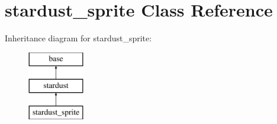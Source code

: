 \hypertarget{classstardust__sprite}{\section{stardust\-\_\-sprite Class Reference}
\label{classstardust__sprite}
}
Inheritance diagram for stardust\-\_\-sprite\-:\begin{figure}[H]
\begin{center}
\leavevmode
\includegraphics[height=3.000000cm]{classstardust__sprite}
\end{center}
\end{figure}
